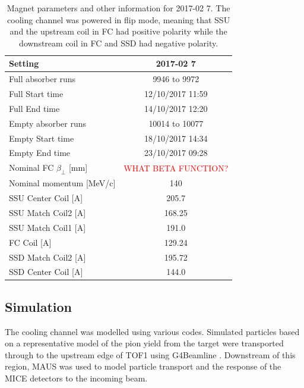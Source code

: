 \begin{table}
\centering
\caption{Magnet parameters and other information for 2017-02 7. The cooling channel was powered in 
flip mode, meaning that SSU and the upstream coil in FC had positive polarity 
while the downstream coil in FC and SSD had negative polarity.
\label{tab:magnet_parameters}}

\begin{tabular}{|l|c|}
\hline
Setting                       & 2017-02 7    \\
\hline
Full absorber runs            & 9946 to 9972 \\
Full Start time               & 12/10/2017 11:59  \\
Full End time                 & 14/10/2017 12:20  \\
Empty absorber runs           & 10014 to 10077 \\
Empty Start time              & 18/10/2017 14:34  \\
Empty End time                & 23/10/2017 09:28  \\
Nominal FC $\beta_\perp$ [mm] & \textcolor{red}{WHAT BETA FUNCTION?}  \\
Nominal momentum [MeV/c]      & 140          \\
\hline
SSU Center Coil [A]           & 205.7        \\
SSU Match Coil2 [A]           & 168.25       \\
SSU Match Coil1 [A]           & 191.0        \\
\hline
FC Coil [A]                   & 129.24       \\
\hline
SSD Match Coil2 [A]           & 195.72       \\
SSD Center Coil [A]           & 144.0        \\
\hline
\end{tabular}
\end{table}

\subsection{Simulation}
The cooling channel was modelled using various codes. Simulated particles based on a representative model of the pion yield from the target were transported through to the upstream edge of TOF1 using G4Beamline \cite{g4beamline}. Downstream of this region, MAUS \cite{maus} was used to model particle transport and the response of the MICE detectors to the incoming beam.


